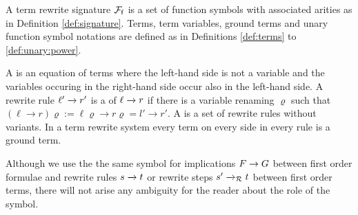 \begin{definition}\label{def:rewrite:signature}
	A term rewrite signature \( {\mathcal{F}_{\mathsf{f}}} \) is a set of function symbols
	with associated arities
	as in Definition \ref{def:signature}.
	Terms, term variables, ground terms and unary function symbol notations
	are defined as in Definitions \ref{def:terms} to \ref{def:unary:power}.
\end{definition}


\begin{definition}\label{def:rewriterule}
	A  is an equation of terms where the left-hand side is not a variable
	and the variables occuring in the right-hand side occur also in the left-hand side.
	A rewrite rule \( \ell'\xrightarrow[{}]{} r' \) is a  of \( \ell\xrightarrow[{}]{} r \) if there is a variable renaming \( \varrho \)
	such that
	\( (\ell\rightarrow r)\varrho := \ell\varrho\rightarrow r\varrho = l'\rightarrow r' \).
	A  is a set of rewrite rules without variants.
	In a  term rewrite system every term on every side in every rule is a ground term.
\end{definition}

Although we use the the same symbol for implications \( F\rightarrow G \) between first order formulae
and rewrite rules \( s\xrightarrow[{}]{} t \) or rewrite steps \( s'\xrightarrow[{}]{}_{\mathcal{R}} t \) between first order terms,
there will not arise any ambiguity for the reader about the role of the symbol.


